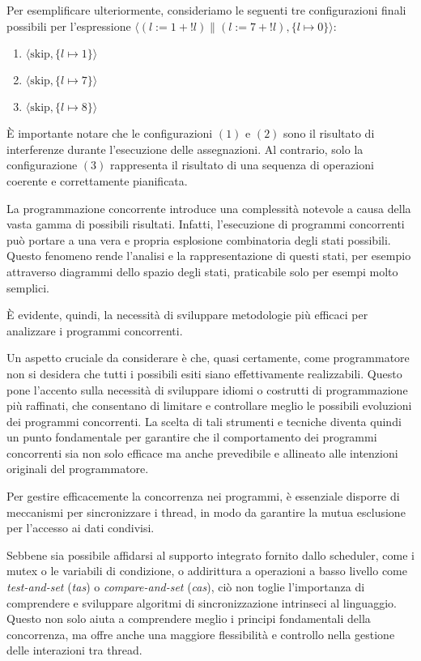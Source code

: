 Per esemplificare ulteriormente, consideriamo le seguenti tre configurazioni
finali possibili per l'espressione \( \langle (l := 1 + !l) \parallel (l := 7 + !l),
\{ l \mapsto 0 \} \rangle \):
\begin{enumerate}
    \item \( \langle \text{skip}, \{ l \mapsto 1 \} \rangle \)
    \item \( \langle \text{skip}, \{ l \mapsto 7 \} \rangle \)
    \item \( \langle \text{skip}, \{ l \mapsto 8 \} \rangle \)
\end{enumerate}
È importante notare che le configurazioni $(1)$ e $(2)$ sono il risultato di
interferenze durante l'esecuzione delle assegnazioni. Al contrario, solo la
configurazione $(3)$ rappresenta il risultato di una sequenza di operazioni
coerente e correttamente pianificata.

La programmazione concorrente introduce una complessità notevole a causa della
vasta gamma di possibili risultati. Infatti, l'esecuzione di programmi concorrenti
può portare a una vera e propria esplosione combinatoria degli stati possibili.
Questo fenomeno rende l'analisi e la rappresentazione di questi stati, per esempio
attraverso diagrammi dello spazio degli stati, praticabile solo per
esempi molto semplici. 

È evidente, quindi, la necessità di sviluppare metodologie più efficaci per
analizzare i programmi concorrenti.

Un aspetto cruciale da considerare è che, quasi certamente, come programmatore
non si desidera che tutti i possibili esiti siano effettivamente realizzabili.
Questo pone l'accento sulla necessità di sviluppare idiomi o costrutti di
programmazione più raffinati, che consentano di limitare e controllare meglio
le possibili evoluzioni dei programmi concorrenti. La scelta di tali strumenti
e tecniche diventa quindi un punto fondamentale per garantire che il comportamento
dei programmi concorrenti sia non solo efficace ma anche prevedibile e allineato
alle intenzioni originali del programmatore.

Per gestire efficacemente la concorrenza nei programmi, è essenziale disporre
di meccanismi per sincronizzare i thread, in modo da garantire la mutua esclusione
per l'accesso ai dati condivisi. 

Sebbene sia possibile affidarsi al supporto integrato fornito dallo scheduler,
come i mutex o le variabili di condizione, o addirittura a operazioni a basso
livello come \textit{test-and-set} (\textit{tas}) o \textit{compare-and-set}
(\textit{cas}), ciò non toglie l'importanza di comprendere e sviluppare algoritmi di
sincronizzazione intrinseci al linguaggio. Questo non solo aiuta a comprendere
meglio i principi fondamentali della concorrenza, ma offre anche una maggiore
flessibilità e controllo nella gestione delle interazioni tra thread.
